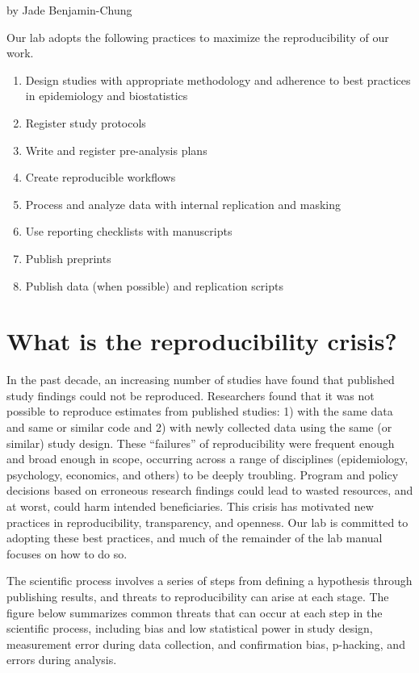 \documentclass[
]{book}
\providecommand{\tightlist}{%
  \setlength{\itemsep}{0pt}\setlength{\parskip}{0pt}}
\begin{document}
by Jade Benjamin-Chung

Our lab adopts the following practices to maximize the reproducibility of our work.

\begin{enumerate}
\def\labelenumi{\arabic{enumi}.}
\tightlist
\item
  Design studies with appropriate methodology and adherence to best practices in epidemiology and biostatistics
\item
  Register study protocols
\item
  Write and register pre-analysis plans
\item
  Create reproducible workflows
\item
  Process and analyze data with internal replication and masking
\item
  Use reporting checklists with manuscripts
\item
  Publish preprints
\item
  Publish data (when possible) and replication scripts
\end{enumerate}

\section{What is the reproducibility crisis?}\label{what-is-the-reproducibility-crisis}

In the past decade, an increasing number of studies have found that published study findings could not be reproduced. Researchers found that it was not possible to reproduce estimates from published studies: 1) with the same data and same or similar code and 2) with newly collected data using the same (or similar) study design. These ``failures'' of reproducibility were frequent enough and broad enough in scope, occurring across a range of disciplines (epidemiology, psychology, economics, and others) to be deeply troubling. Program and policy decisions based on erroneous research findings could lead to wasted resources, and at worst, could harm intended beneficiaries. This crisis has motivated new practices in reproducibility, transparency, and openness. Our lab is committed to adopting these best practices, and much of the remainder of the lab manual focuses on how to do so.

The scientific process involves a series of steps from defining a hypothesis through publishing results, and threats to reproducibility can arise at each stage. The figure below summarizes common threats that can occur at each step in the scientific process, including bias and low statistical power in study design, measurement error during data collection, and confirmation bias, p-hacking, and errors during analysis.
\end{document}
